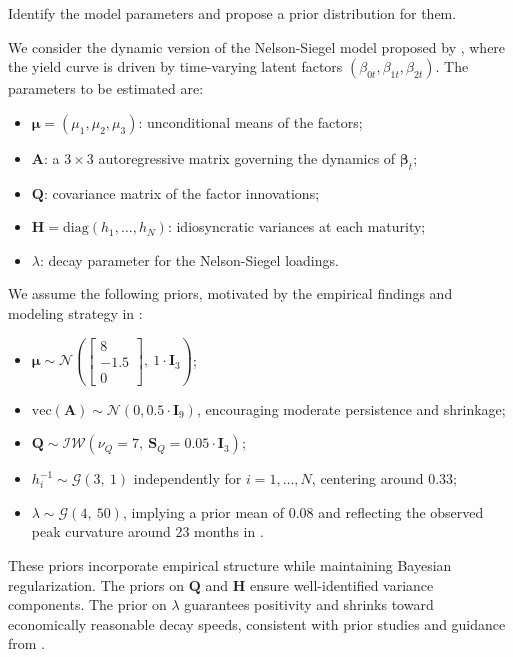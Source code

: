 Identify the model parameters and propose a prior distribution for them.

We consider the dynamic version of the Nelson-Siegel model proposed by \citet{diebold2006macroeconomy}, where the yield curve is driven by time-varying latent factors $(\beta_{0t}, \beta_{1t}, \beta_{2t})$. The parameters to be estimated are:

\begin{itemize}
  \item $\boldsymbol{\mu} = (\mu_1, \mu_2, \mu_3)$: unconditional means of the factors;
  \item $\mathbf{A}$: a $3 \times 3$ autoregressive matrix governing the dynamics of $\boldsymbol{\beta}_t$;
  \item $\mathbf{Q}$: covariance matrix of the factor innovations;
  \item $\mathbf{H} = \mathrm{diag}(h_1, \ldots, h_N)$: idiosyncratic variances at each maturity;
  \item $\lambda$: decay parameter for the Nelson-Siegel loadings.
\end{itemize}

We assume the following priors, motivated by the empirical findings and modeling strategy in \citet{diebold2006macroeconomy}:

\begin{itemize}
  \item $\boldsymbol{\mu} \sim \mathcal{N}\left( 
    \begin{bmatrix} 8 \\ -1.5 \\ 0 \end{bmatrix},\ 
    1 \cdot \mathbf{I}_3 \right)$;
  \item $\mathrm{vec}(\mathbf{A}) \sim \mathcal{N}(0, 0.5 \cdot \mathbf{I}_9)$, encouraging moderate persistence and shrinkage;
  \item $\mathbf{Q} \sim \mathcal{IW}(\nu_Q = 7,\ \mathbf{S}_Q = 0.05 \cdot \mathbf{I}_3)$;
  \item $h_i^{-1} \sim \mathcal{G}(3,\ 1)$ independently for $i = 1, \dots, N$, centering around 0.33;
  \item $\lambda \sim \mathcal{G}(4,\ 50)$, implying a prior mean of 0.08 and reflecting the observed peak curvature around 23 months in \citet{diebold2006macroeconomy}.
\end{itemize}

These priors incorporate empirical structure while maintaining Bayesian regularization. The priors on $\mathbf{Q}$ and $\mathbf{H}$ ensure well-identified variance components. The prior on $\lambda$ guarantees positivity and shrinks toward economically reasonable decay speeds, consistent with prior studies and guidance from \citet{koop2010}.

